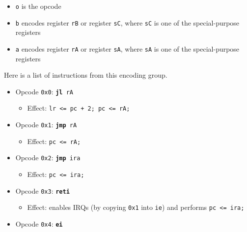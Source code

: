 \documentclass{article}
\begin{document}
	\singlespacing
	\begin{itemize}
	\item \texttt{o} is the opcode
	\item \texttt{b} encodes register \texttt{rB} or register
	\texttt{sC}, where \texttt{sC} is one of the special-purpose registers
	\item \texttt{a} encodes register \texttt{rA} or register
	\texttt{sA}, where \texttt{sA} is one of the special-purpose registers
	\end{itemize}
	\doublespacing

	Here is a list of instructions from this encoding group.

	\singlespacing
	\begin{itemize}
	\item Opcode \texttt{0x0}:
		\texttt{\textbf{jl} rA}
		\begin{itemize}
		\item Effect: \texttt{lr <= pc + 2; pc <= rA;}
		\end{itemize}
	\item Opcode \texttt{0x1}:
		\texttt{\textbf{jmp} rA}
		\begin{itemize}
		\item Effect: \texttt{pc <= rA;}
		\end{itemize}
	\item Opcode \texttt{0x2}:
		\texttt{\textbf{jmp} ira}
		\begin{itemize}
		\item Effect: \texttt{pc <= ira;}
		\end{itemize}
	\item Opcode \texttt{0x3}:
		\texttt{\textbf{reti}}
		\begin{itemize}
		\item Effect: enables IRQs (by copying \texttt{0x1} into
		\texttt{ie}) and performs \texttt{pc <= ira;}
		\end{itemize}
	\item Opcode \texttt{0x4}:
		\texttt{\textbf{ei}}
		\begin{itemize}

\end{itemize}
\end{itemize}
\end{document}
